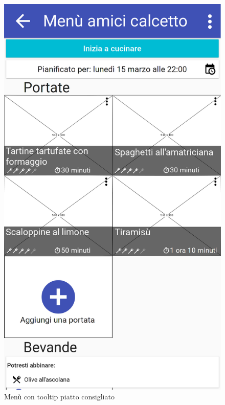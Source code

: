 \begin{figure}[H]
	\begin{minipage}{.49\textwidth}
		\includegraphics[width=\textwidth]{img/wireframe/men_amici_calcetto_menu_contestuale_piatto.png}
		\caption{Menù con tooltip piatto consigliato}
		\label{fig:menu_tooltip}
	\end{minipage}
	\hfill
	\begin{minipage}{.49\textwidth}

\end{minipage}
\end{figure}
